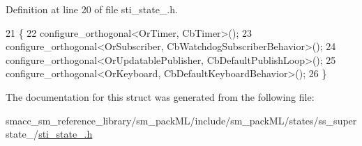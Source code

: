 Definition at line 20 of file sti\+\_\+state\+\_.\+h.


\begin{DoxyCode}
21   \{
22     configure\_orthogonal<OrTimer, CbTimer>();
23     configure\_orthogonal<OrSubscriber, CbWatchdogSubscriberBehavior>();
24     configure\_orthogonal<OrUpdatablePublisher, CbDefaultPublishLoop>();
25     configure\_orthogonal<OrKeyboard, CbDefaultKeyboardBehavior>();
26   \}
\end{DoxyCode}


The documentation for this struct was generated from the following file\+:\begin{DoxyCompactItemize}
\item 
smacc\+\_\+sm\+\_\+reference\+\_\+library/sm\+\_\+pack\+M\+L/include/sm\+\_\+pack\+M\+L/states/ss\+\_\+superstate\+\_/\hyperlink{sti__state__5_8h}{sti\+\_\+state\+\_.\+h}\end{DoxyCompactItemize}
